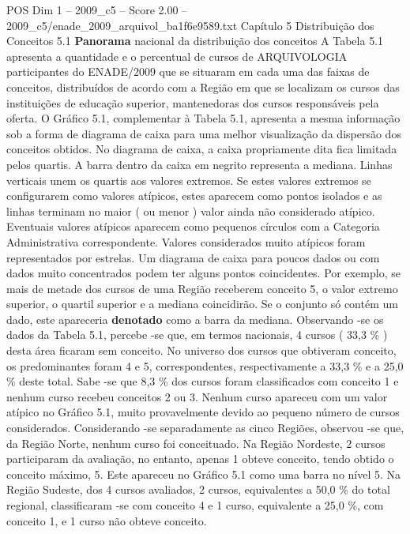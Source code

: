 \begin{textsample}{POS Dim 1 – 2009\_c5 – Score 2.00 – 2009\_c5/enade\_2009\_arquivol\_ba1f6e9589.txt}  \label{ex:f1_pos_142}
Capítulo 5 Distribuição dos Conceitos 5.1 \textbf{Panorama} nacional da distribuição dos conceitos A Tabela 5.1 apresenta a quantidade e o percentual de cursos de ARQUIVOLOGIA participantes do ENADE/2009 que se situaram em cada uma das faixas de conceitos, distribuídos de acordo com a Região em que se localizam os cursos das instituições de educação superior, mantenedoras dos cursos responsáveis pela oferta.
O Gráfico 5.1, complementar à Tabela 5.1, apresenta a mesma informação sob a forma de diagrama de caixa para uma melhor visualização da dispersão dos conceitos obtidos.
No diagrama de caixa, a caixa propriamente dita fica limitada pelos quartis.
A barra dentro da caixa em negrito representa a mediana.
Linhas verticais unem os quartis aos valores extremos.
Se estes valores extremos se configurarem como valores atípicos, estes aparecem como pontos isolados e as linhas terminam no maior ( ou menor ) valor ainda não considerado atípico.
Eventuais valores atípicos aparecem como pequenos círculos com a Categoria Administrativa correspondente.
Valores considerados muito atípicos foram representados por estrelas.
Um diagrama de caixa para poucos dados ou com dados muito concentrados podem ter alguns pontos coincidentes.
Por exemplo, se mais de metade dos cursos de uma Região receberem conceito 5, o valor extremo superior, o quartil superior e a mediana coincidirão.
Se o conjunto só contém um dado, este apareceria \textbf{denotado} como a barra da mediana.
Observando -se os dados da Tabela 5.1, percebe -se que, em termos nacionais, 4 cursos ( 33,3 \% ) desta área ficaram sem conceito.
No universo dos cursos que obtiveram conceito, os predominantes foram 4 e 5, correspondentes, respectivamente a 33,3 \% e a 25,0 \% deste total.
Sabe -se que 8,3 \% dos cursos foram classificados com conceito 1 e nenhum curso recebeu conceitos 2 ou 3.
Nenhum curso apareceu com um valor atípico no Gráfico 5.1, muito provavelmente devido ao pequeno número de cursos considerados.
Considerando -se separadamente as cinco Regiões, observou -se que, da Região Norte, nenhum curso foi conceituado.
Na Região Nordeste, 2 cursos participaram da avaliação, no entanto, apenas 1 obteve conceito, tendo obtido o conceito máximo, 5.
Este apareceu no Gráfico 5.1 como uma barra no nível 5.
Na Região Sudeste, dos 4 cursos avaliados, 2 cursos, equivalentes a 50,0 \% do total regional, classificaram -se com conceito 4 e 1 curso, equivalente a 25,0 \%, com conceito 1, e 1 curso não obteve conceito.

\end{textsample}
